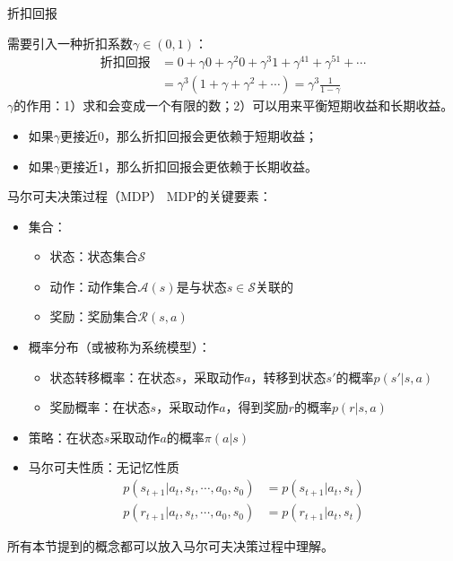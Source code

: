 \begin{frame}{折扣回报}
\begin{center}
    \end{center}
    需要引入一种折扣系数$\gamma\in(0,1)$：
    \[
        \begin{aligned}
            \text{折扣回报}&=0+\gamma 0 +\gamma^2 0+\gamma^3 1 +\gamma^41+\gamma^51+\cdots\\
            &=\gamma^3(1+\gamma+\gamma^2+\cdots)=\gamma^3\frac{1}{1-\gamma}
        \end{aligned}
    \]
    $\gamma$的作用：1）求和会变成一个有限的数；2）可以用来平衡短期收益和长期收益。
    \begin{itemize}
        \item 如果$\gamma$更接近0，那么折扣回报会更依赖于短期收益；
        \item 如果$\gamma$更接近1，那么折扣回报会更依赖于长期收益。
    \end{itemize}
\end{frame}

\begin{frame}{马尔可夫决策过程（MDP）}
    MDP的关键要素：
    \begin{itemize}
        \item 集合：
        \begin{itemize}
            \item 状态：状态集合$\mathcal{S}$
            \item 动作：动作集合$\mathcal{A}(s)$是与状态$s\in \mathcal{S}$关联的
            \item 奖励：奖励集合$\mathcal{R}(s,a)$
        \end{itemize}
        \item 概率分布（或被称为系统模型）：
        \begin{itemize}
            \item 状态转移概率：在状态$s$，采取动作$a$，转移到状态$s'$的概率$p(s'|s,a)$
            \item 奖励概率：在状态$s$，采取动作$a$，得到奖励$r$的概率$p(r|s,a)$
        \end{itemize}
        \item 策略：在状态$s$采取动作$a$的概率$\pi(a|s)$
        \item 马尔可夫性质：无记忆性质
        \[
            \begin{aligned}
                p(s_{t+1}|a_t, s_t, \cdots, a_0, s_0)&=p(s_{t+1}|a_t,s_t) \\
                p(r_{t+1}|a_t, s_t, \cdots, a_0, s_0)&=p(r_{t+1}|a_t,s_t)
            \end{aligned}
        \]
    \end{itemize}
    所有本节提到的概念都可以放入马尔可夫决策过程中理解。 
\end{frame}

